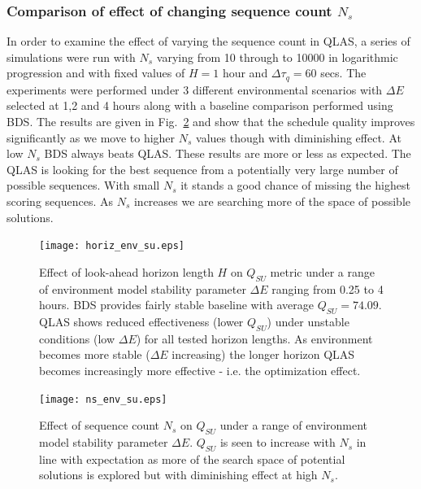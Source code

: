 \documentclass[12pt,a4paper]{article}
\begin{document}
{\subsubsection{Comparison of effect of changing sequence count $N_s$} 
In order to examine the effect of varying the sequence count in QLAS, a series of simulations were run with $N_s$ varying from 10 through to 10000 in logarithmic progression and with fixed values of $H = 1$ hour and $\Delta \tau _q = 60$ secs. The experiments were performed under 3 different environmental scenarios with $\Delta E$ selected at 1,2 and 4 hours along with a baseline comparison performed using BDS. The results are given in Fig.~\ref{fig:ns_denv} and show that the schedule quality improves significantly as we move to higher $N_s$ values though with diminishing effect. At low $N_s$ BDS always beats QLAS. These results are more or less as expected. The QLAS is looking for the best sequence from a potentially very large number of possible sequences. With small $N_s$ it stands a good chance of missing  the highest scoring sequences. As $N_s$ increases we are searching more of the space of possible solutions. 

\begin{figure}[htp]
\begin{center}
  \texttt{[image: horiz\_env\_su.eps]}
\caption[Effect of look-ahead horizon length $H$ on $Q_{SU}$ under a range of environmental conditions]
{\label{fig:hor_denv}Effect of look-ahead horizon length $H$ on $Q_{SU}$  metric under a range of environment model stability parameter $\Delta E$ ranging from 0.25 to 4 hours. BDS provides fairly stable baseline with average $Q_{SU}=74.09$. QLAS shows reduced effectiveness (lower $Q_{SU}$) under unstable conditions (low $\Delta E$) for all tested horizon lengths. As environment becomes more stable ($\Delta E$ increasing) the longer horizon QLAS becomes increasingly more effective - i.e. the optimization effect.}
\end{center}
\end{figure}

\begin{figure}[htp]
\begin{center}
  \texttt{[image: ns\_env\_su.eps]}
\caption[Effect of sequence count $N_s$ on $Q_{SU}$ under a range of environmental conditions]
{ \label{fig:ns_denv}Effect of sequence count $N_s$ on $Q_{SU}$ under a range of environment model stability parameter $\Delta E$. $Q_{SU}$ is seen to increase with $N_s$ in line with expectation as more of the search space of potential solutions is explored but with diminishing effect at high $N_s$.}
\end{center}
\end{figure}

}
\end{document}
